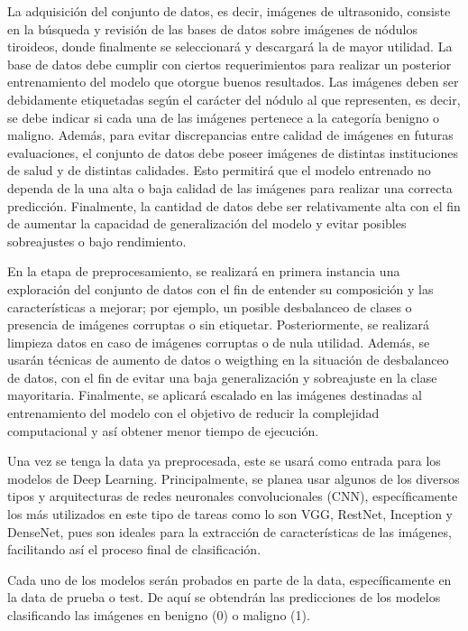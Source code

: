 La adquisición del conjunto de datos, es decir, imágenes de ultrasonido, consiste en la búsqueda y revisión de las bases de datos sobre imágenes de nódulos tiroideos, donde finalmente se seleccionará y descargará la de mayor utilidad. La base de datos debe cumplir con ciertos requerimientos para realizar un posterior entrenamiento del modelo que otorgue buenos resultados. Las imágenes deben ser debidamente etiquetadas según el carácter del nódulo al que representen, es decir, se debe indicar si cada una de las imágenes pertenece a la categoría benigno o maligno. Además, para evitar discrepancias entre calidad de imágenes en futuras evaluaciones, el conjunto de datos debe poseer imágenes de distintas instituciones de salud y de distintas calidades. Esto permitirá que el modelo entrenado no dependa de la una alta o baja calidad de las imágenes para realizar una correcta predicción. Finalmente, la cantidad de datos debe ser relativamente alta con el fin de aumentar la capacidad de generalización del modelo y evitar posibles sobreajustes o bajo rendimiento.  

En la etapa de preprocesamiento, se realizará en primera instancia una exploración del conjunto de datos con el fin de entender su composición y las características a mejorar; por ejemplo, un posible desbalanceo de clases o presencia de imágenes corruptas o sin etiquetar. Posteriormente, se realizará limpieza datos en caso de imágenes corruptas o de nula utilidad. Además, se usarán técnicas de aumento de datos o weigthing en la situación de desbalanceo de datos, con el fin de evitar una baja generalización y sobreajuste en la clase mayoritaria.  Finalmente, se aplicará escalado en las imágenes destinadas al entrenamiento del modelo con el objetivo de reducir la complejidad computacional y así obtener menor tiempo de ejecución.

Una vez se tenga la data ya preprocesada, este se usará como entrada para los modelos de Deep Learning. Principalmente, se planea usar algunos de los diversos tipos y arquitecturas de redes neuronales convolucionales (CNN), específicamente los más utilizados en este tipo de tareas como lo son VGG, RestNet, Inception y DenseNet, pues son ideales para la extracción de características de las imágenes, facilitando así el proceso final de clasificación. 

Cada uno de los modelos serán probados en parte de la data, específicamente en la data de prueba o test. De aquí se obtendrán las predicciones de los modelos clasificando las imágenes en benigno (0) o maligno (1).

